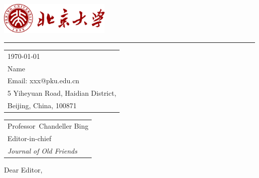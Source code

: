 \documentclass{article}
\newlength{\rulewidth}
\begin{document}

\includegraphics[width=0.4\textwidth]{./img/pku.drawio.pdf} %

\vspace{-1em} %

\textcolor{pkured}{\rule{\linewidth}{}} %

\bigskip\bigskip %


\hfill
\begin{tabular}{l @{}}
\hfill \today \bigskip\\ %
\hfill Name \\ %
\hfill Email: xxx@pku.edu.cn \\ %
\hfill 5 Yiheyuan Road, Haidian District,\\
\hfill Beijing, China, 100871 \\ %
\end{tabular}

\bigskip %


\begin{tabular}{@{} l}
	Professor\ Chandeller Bing \\
	Editor-in-chief \\
	\textit{Journal of Old Friends}
\end{tabular}

\bigskip %

Dear Editor,

\bigskip %

\end{document}
